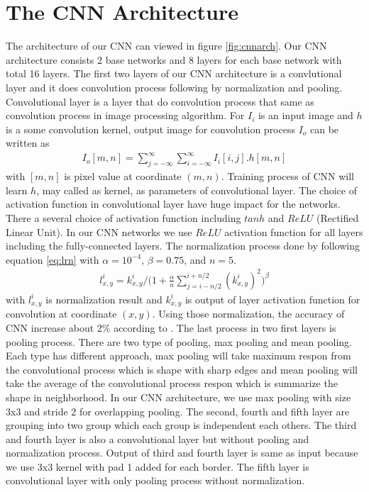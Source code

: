 \documentclass[conference]{IEEEtran}
\begin{document}
\section{The CNN Architecture}


The architecture of our CNN can viewed in figure \ref{fig:cnnarch}. Our CNN architecture consists 2 base networks and 8 layers for each base network with total 16 layers. The first two layers of our CNN architecture is a convlutional layer and it does convolution process following by normalization and pooling. Convolutional layer is a layer that do convolution process that same as convolution process in image processing algorithm. For $I_i$ is an input image and $h$ is a some convolution kernel, output image for convolution process $I_o$ can be written as
\begin{align}
	I_o[m,n] = \sum_{j=-\infty}^\infty\sum_{i=-\infty}^\infty I_i[i,j].h[m,n]
\end{align}
with $[m,n]$ is pixel value at coordinate $(m,n)$. Training process of CNN will learn $h$, may called as kernel, as parameters of convolutional layer. The choice of activation function in convolutional layer have huge impact for the networks. There a several choice of activation function including $tanh$ and $ReLU$ (Rectified Linear Unit). In our CNN networks we use $ReLU$ activation function for all layers including the fully-connected layers. The normalization process done by following equation \ref{eq:lrn} with $\alpha=10^{-4}$, $\beta=0.75$, and $n=5$.
\begin{align}
	l^i_{x,y} = k^i_{x,y} / \bigg(1 + \frac{\alpha}{n}\sum_{j=i-n/2}^{i+n/2} (k^i_{x,y})^2\bigg)^\beta
	\label{eq:lrn}	
\end{align}
with $l^i_{x,y}$ is normalization result and $k^i_{x,y}$ is output of layer activation function for convolution at coordinate $(x,y)$. Using those normalization, the accuracy of CNN increase about 2\% according to \cite{alex}. The last process in two first layers is pooling process. There are two type of pooling, max pooling and mean pooling. Each type has different approach, max pooling will take maximum respon from the convolutional process which is shape with sharp edges and mean pooling will take the average of the convolutional process respon which is summarize the shape in neighborhood. In our CNN architecture, we use max pooling with size 3x3 and stride 2 for overlapping pooling. The second, fourth and fifth layer are grouping into two group which each group is independent each others. The third and fourth layer is also a convolutional layer but without pooling and normalization process. Output of third and fourth layer is same as input because we use 3x3 kernel with pad 1 added for each border. The fifth layer is convolutional layer with only pooling process without normalization. 
\end{document}
